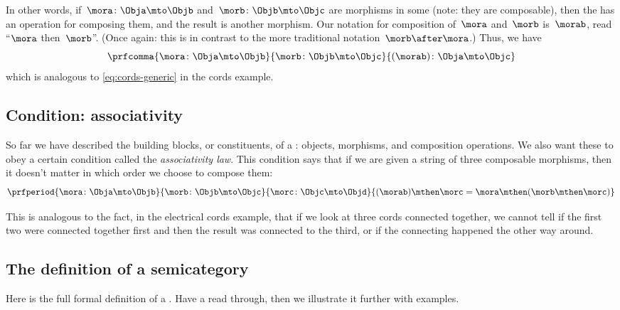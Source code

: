 In other words, if~$\mora\colon \Obja \mto \Objb$ and~$\morb\colon \Objb \mto \Objc$ are morphisms in some  (note: they are composable), then the  has an operation for composing them, and the result is another morphism.
Our notation for composition of~$\mora$ and~$\morb$ is~$\morab$, read ``$\mora$ then~$\morb$''.
(Once again: this is in contrast to the more traditional notation~$\morb \after \mora$.)
Thus, we have
\begin{equation}
    \prfcomma{
        \mora \colon \Obja \mto \Objb
    }{
        \morb\colon \Objb \mto \Objc
    }{
        (\morab )\colon \Obja \mto \Objc
    }
\end{equation}
which is analogous to \cref{eq:cords-generic} in the cords example.

\subsection{Condition: associativity}

So far we have described the building blocks, or constituents, of a : objects, morphisms, and composition operations.
We also want these to obey a certain condition called the \emph{associativity law}.
This condition says that if we are given a string of three composable morphisms, then it doesn't matter in which order we choose to compose them:
\begin{equation}
    \prfperiod{
        \mora \colon \Obja \mto \Objb
    }{
        \morb\colon \Objb \mto \Objc
    }{
        \morc \colon \Objc \mto \Objd
    }{
        (\morab ) \mthen \morc = \mora \mthen ( \morb \mthen \morc )
    }
\end{equation}

This is analogous to the fact, in the electrical cords example, that if we look at three cords connected together, we cannot tell if the first two were connected together first and then the result was connected to the third, or if the connecting happened the other way around.

\subsection{The definition of a semicategory}

Here is the full formal definition of a .
Have a read through, then we illustrate it further with examples.

